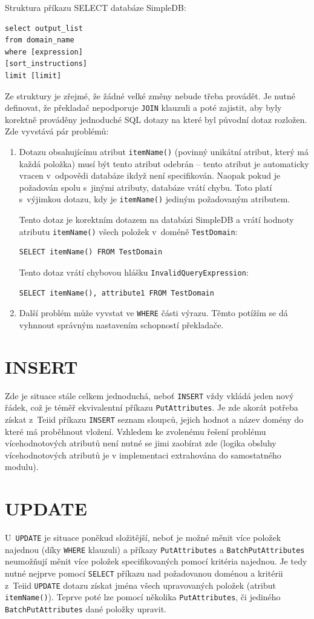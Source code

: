 \documentclass[oneside,12pt,final]{fithesis2}
\begin{document}
Struktura příkazu SELECT databáze SimpleDB:
\begin{Verbatim}[frame=leftline,fontsize=\small]
select output_list
from domain_name
where [expression]
[sort_instructions]
limit [limit] 
\end{Verbatim}
Ze struktury je zřejmé, že žádné velké změny nebude třeba provádět. Je nutné definovat, že překladač nepodporuje \verb<JOIN< klauzuli a poté zajistit, aby byly korektně prováděny jednoduché SQL dotazy na které byl původní dotaz rozložen. Zde vyvstává pár problémů:
\begin{enumerate}
 \item Dotazu obsahujícímu atribut \verb<itemName()< (povinný unikátní atribut, který má každá položka) musí být tento atribut odebrán -- tento atribut je automaticky vracen v~odpovědi databáze ikdyž není specifikován. Naopak pokud je požadován spolu s~jinými atributy, databáze vrátí chybu. Toto platí s~výjimkou dotazu, kdy je \verb<itemName()< jediným požadovaným atributem.
 
 Tento dotaz je korektním dotazem na databázi SimpleDB a vrátí hodnoty atributu \verb<itemName()< všech položek v~doméně \verb<TestDomain<:
 \begin{Verbatim}[fontsize=\small]
SELECT itemName() FROM TestDomain
  \end{Verbatim}
 Tento dotaz vrátí chybovou hlášku \verb<InvalidQueryExpression<:
  \begin{Verbatim}[fontsize=\small]
SELECT itemName(), attribute1 FROM TestDomain
  \end{Verbatim}
 \item Další problém může vyvstat ve \texttt{WHERE} části výrazu. Těmto potížím se dá vyhnnout správným nastavením schopností překladače. 
\end{enumerate}

\section{INSERT}
Zde je situace stále celkem jednoduchá, neboť \verb<INSERT< vždy vkládá jeden nový řádek, což je téměř ekvivalentní příkazu \verb<PutAttributes<. Je zde akorát potřeba získat z~Teiid příkazu \verb<INSERT< seznam sloupců, jejich hodnot a název domény do které má proběhnout vložení. Vzhledem ke zvolenému řešení problému vícehodnotových atributů není nutné se jimi zaobírat zde (logika obsluhy vícehodnotových atributů je v implementaci extrahována do samostatného modulu).
\section{UPDATE}
U~\verb<UPDATE< je situace poněkud složitější, neboť je možné měnit více položek najednou (díky \verb<WHERE< klauzuli) a příkazy \verb<PutAttributes< a \verb<BatchPutAttributes< neumožňují měnit více položek specifikovaných pomocí kritéria najednou. Je tedy nutné nejprve pomocí \verb<SELECT< příkazu nad požadovanou doménou a kritérii z~Teiid \verb<UPDATE< dotazu získat jména všech upravovaných položek (atribut \verb<itemName()<). Teprve poté lze pomocí několika \verb<PutAttributes<, či jediného \verb<BatchPutAttributes< dané položky upravit.
\end{document}
